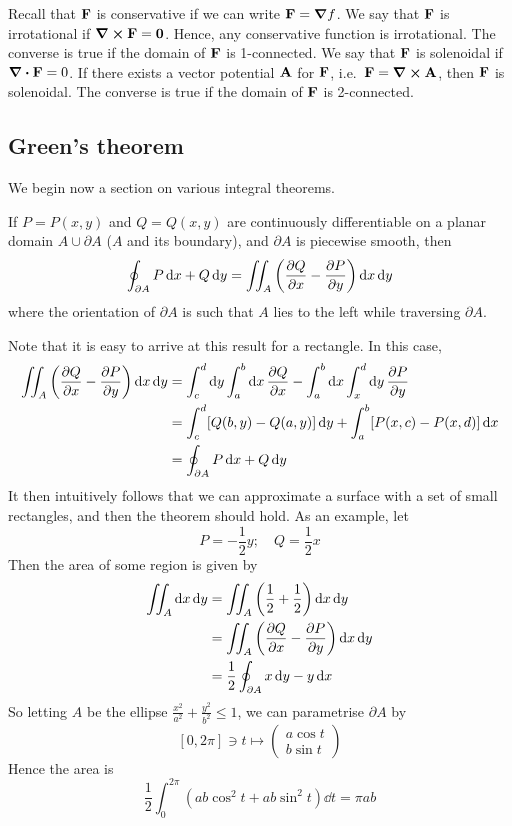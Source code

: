 Recall that \(\vb F\) is conservative if we can write \(\vb F = \grad f\).
We say that \(\vb F\) is irrotational if \(\curl{\vb F} = \vb 0\).
Hence, any conservative function is irrotational.
The converse is true if the domain of \(\vb F\) is 1-connected.
We say that \(\vb F\) is solenoidal if \(\div{\vb F} = 0\).
If there exists a vector potential \(\vb A\) for \(\vb F\), i.e.\ \(\vb F = \curl{\vb A}\), then \(\vb F\) is solenoidal.
The converse is true if the domain of \(\vb F\) is 2-connected.

\subsection{Green's theorem}
We begin now a section on various integral theorems.
\begin{proposition}
	If \(P = P(x, y)\) and \(Q = Q(x, y)\) are continuously differentiable on a planar domain \(A \cup \partial A\) (\(A\) and its boundary), and \(\partial A\) is piecewise smooth, then
	\[
		\oint_{\partial A} P \dd{x} + Q \dd{y} = \iint_{A} \left( \pdv{Q}{x} - \pdv{P}{y} \right) \dd{x}\dd{y}
	\]
	where the orientation of \(\partial A\) is such that \(A\) lies to the left while traversing \(\partial A\).
\end{proposition}
\noindent Note that it is easy to arrive at this result for a rectangle.
In this case,
\begin{align*}
	\iint_{A} \left( \pdv{Q}{x} - \pdv{P}{y} \right) \dd{x}\dd{y} & = \int_c^d \dd{y} \int_a^b \dd{x} \pdv{Q}{x} - \int_a^b \dd{x} \int_x^d \dd{y} \pdv{P}{y} \\
	                                                              & = \int_c^d [Q(b, y) - Q(a, y)] \dd{y} + \int_a^b [P(x, c) - P(x, d)] \dd{x}               \\
	                                                              & = \oint_{\partial A} P \dd{x} + Q \dd{y}
\end{align*}
It then intuitively follows that we can approximate a surface with a set of small rectangles, and then the theorem should hold.
As an example, let
\[
	P = -\frac{1}{2}y;\quad Q = \frac{1}{2}x
\]
Then the area of some region is given by
\begin{align*}
	\iint_A \dd{x}\dd{y} & = \iint_A \left( \frac{1}{2} + \frac{1}{2} \right) \dd{x}\dd{y} \\
	                     & = \iint_A \left( \pdv{Q}{x} - \pdv{P}{y} \right) \dd{x}\dd{y}   \\
	                     & = \frac{1}{2}\oint_{\partial A} x\dd{y} - y\dd{x}
\end{align*}
So letting \(A\) be the ellipse \(\frac{x^2}{a^2} + \frac{y^2}{b^2} \leq 1\), we can parametrise \(\partial A\) by
\[
	[0, 2 \pi] \ni t \mapsto \begin{pmatrix}
		a \cos t \\ b \sin t
	\end{pmatrix}
\]
Hence the area is
\[
	\frac{1}{2}\int_0^{2\pi} \left( ab\cos^2 t + ab\sin^2 t \right) \dd{t} = \pi ab
\]
